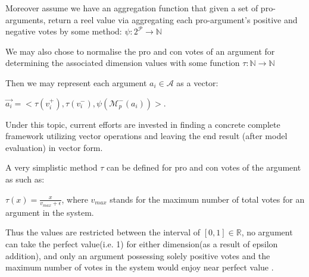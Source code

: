 \documentclass{article}
\newcommand{\nat}{\mathbb{N}}   %
\newcommand{\args}{\mathcal{A}} %
\begin{document}
Moreover assume we have an aggregation function that given a set of pro-arguments, return a reel value via aggregating each pro-argument's positive and negative votes by some method:  $\psi: 2^{\mathcal{P}} \to \nat$

We may also chose to normalise the pro and con votes of an argument for determining the associated dimension values with some function $\tau: \nat \to  \nat$

Then we may represent each argument $a_i \in \args$ as a vector:

 $\vec{a_i} = < \tau(v_{i}^+),  \tau(v_{i}^-), \psi(\mathcal{M}_{p}^{-}(a_{i}))>$.


Under this topic, current efforts are invested in finding a concrete complete framework utilizing vector operations and leaving the end result (after model evaluation) in vector form.

A very simplistic method $\tau$ can be defined for pro and con votes of the argument as such as:
\begin{center}
$\tau(x) = \frac{x}{v_{max} + \epsilon}$, where $v_{max}$ stands for the maximum number of total votes for an argument in the system.
\end{center}

Thus the values are restricted between the interval of $[0,1] \in \mathbb{R}$, no argument can take the perfect value(i.e. 1) for either dimension(as a result of epsilon addition), and only an argument possessing solely positive votes and  the maximum number of votes in the system would enjoy near perfect value . 


\begin{comment}

\begin{tikzpicture}%
\coordinate (V1) at (1, 1.3);
\coordinate (V2) at (-1.6, 0.4);
\coordinate (V3) at ($(V1) + (V2)$);
\coordinate (V4) at ($1.4*(V1)$);
 
\draw[step=10pt, color=black!10] (-2, -1) grid (2, 2);
\draw[&lt;-&gt;, line] (-2, 0) -- node [below, very near end] {$x$} (2, 0);
\draw[&lt;-&gt;, line] (0, -1) -- node [right, very near start] {$y$} (0, 2);
\draw[-&gt;, line, color=orange, thick] (0, 0) -- node [right=2pt, near end] {$\vec{u}$} (V4);
\draw[-&gt;, line, color=blue, thick, densely dashed] (0, 0) -- node [right=2pt] {$\vec{v}$} (V1);
\draw[-&gt;, line, color=red, thick] (0, 0) -- node [above] {$\vec{w}$} (V2);
\draw[-&gt;, line, color=red, densely dotted] (V1) -- +(V2);
\draw[-&gt;, line, color=blue, densely dotted] (V2) -- +(V1);
\draw[-&gt;, line, color=green!70!black, thick] (0, 0) -- node [left] {$\vec{z}$} (V3);
\end{tikzpicture}

\end{comment}
\end{document}
